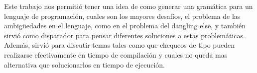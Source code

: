 Este trabajo nos permitió tener una idea de como generar una gramática para un lenguaje de programación, cuales son los mayores desafíos, el problema de las ambigüedades en el lenguaje, como en el problema del dangling else, y también sirvió como disparador para pensar diferentes soluciones a estas problemáticas. Además, sirvió para discutir temas tales como que chequeos de tipo pueden realizarse efectivamente en tiempo de compilación y cuales no queda mas alternativa que solucionarlos en tiempo de ejecución.